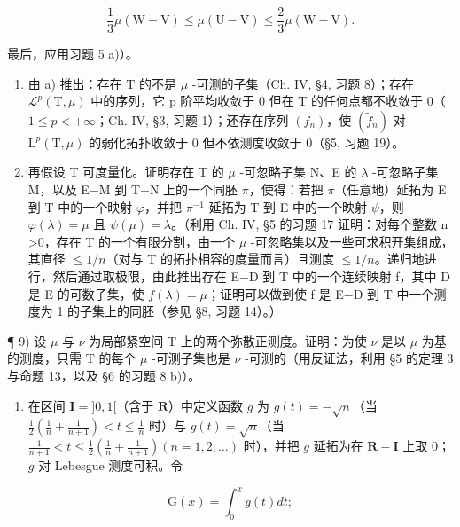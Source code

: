 \[
\frac {1}{3} \mu (\mathrm{W-V}) \leqslant \mu (\mathrm{U-V}) \leqslant \frac {2}{3} \mu (\mathrm{W-V}).
\]

最后，应用习题 5 a)）。

\begin{enumerate}
\def\labelenumi{\alph{enumi})}
\setcounter{enumi}{1}
\item
  由 a) 推出：存在 T 的不是 \(\mu\) -可测的子集（Ch. IV, §4, 习题 8）；存在 \(\mathcal{L}^{p}(\mathrm{T},\mu)\) 中的序列，它 p 阶平均收敛于 0 但在 T 的任何点都不收敛于 0（\(1 \leqslant p < +\infty\)；Ch. IV, §3, 习题 1）；还存在序列 \((f_{n})\)，使 \((\widetilde{f}_{n})\) 对 \(\mathrm{L}^{p}(\mathrm{T},\mu)\) 的弱化拓扑收敛于 0 但不依测度收敛于 0（§5, 习题 19）。
\item
  再假设 T 可度量化。证明存在 T 的 \(\mu\) -可忽略子集 N、E 的 \(\lambda\) -可忽略子集 M，以及 E−M 到 T−N 上的一个同胚 \(\pi\)，使得：若把 \(\pi\)（任意地）延拓为 E 到 T 中的一个映射 \(\varphi\)，并把 \(\pi^{-1}\) 延拓为 T 到 E 中的一个映射 \(\psi\)，则 \(\varphi(\lambda)=\mu\) 且 \(\psi(\mu)=\lambda\)。（利用 Ch. IV, §5 的习题 17 证明：对每个整数 n \textgreater 0，存在 T 的一个有限分割，由一个 \(\mu\) -可忽略集以及一些可求积开集组成，其直径 \(\leqslant1/n\)（对与 T 的拓扑相容的度量而言）且测度 \(\leqslant1/n\)。递归地进行，然后通过取极限，由此推出存在 E−D 到 T 中的一个连续映射 f，其中 D 是 E 的可数子集，使 \(f(\lambda)=\mu\)；证明可以做到使 f 是 E−D 到 T 中一个测度为 1 的子集上的同胚（参见 §8, 习题 14）。）
\end{enumerate}

¶ 9) 设 \(\mu\) 与 \(\nu\) 为局部紧空间 T 上的两个弥散正测度。证明：为使 \(\nu\) 是以 \(\mu\) 为基的测度，只需 T 的每个 \(\mu\) -可测子集也是 \(\nu\) -可测的（用反证法，利用 §5 的定理 3 与命题 13，以及 §6 的习题 8 b)）。

\begin{enumerate}
\def\labelenumi{\arabic{enumi})}
\setcounter{enumi}{9}
\tightlist
\item
  在区间 \(\mathbf{I} = ]0,1[\)（含于 \(\mathbf{R}\)）中定义函数 \(g\) 为 \(g(t) = -\sqrt{n}\)（当 \(\frac{1}{2}\left(\frac{1}{n} + \frac{1}{n+1}\right) < t \leqslant \frac{1}{n}\) 时）与 \(g(t) = \sqrt{n}\)（当 \(\frac{1}{n+1} < t \leqslant \frac{1}{2}\left(\frac{1}{n} + \frac{1}{n+1}\right) (n = 1,2,\ldots)\) 时），并把 \(g\) 延拓为在 \(\mathbf{R} - \mathbf{I}\) 上取 0；\(g\) 对 Lebesgue 测度可积。令
\end{enumerate}

\[
\mathrm{G} (x) = \int_ {0} ^ {x} g (t) d t;
\]

